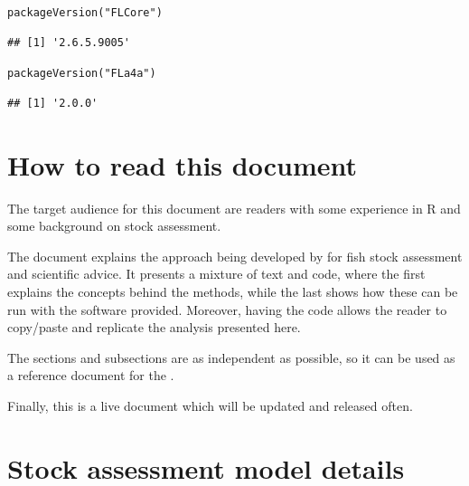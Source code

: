 \documentclass[a4paper,english,10pt]{article}\usepackage[]{graphicx}\usepackage[]{color}
\makeatletter
\newcommand{\hlstr}[1]{\textcolor[rgb]{0.063,0.58,0.627}{#1}}%
\newcommand{\hlstd}[1]{\textcolor[rgb]{0.196,0.196,0.196}{#1}}%
\newcommand{\hlkwd}[1]{\textcolor[rgb]{0.78,0.227,0.412}{#1}}%
\newenvironment{kframe}{%
 \def\at@end@of@kframe{}%
 \ifinner\ifhmode%
  \def\at@end@of@kframe{\end{minipage}}%
  \begin{minipage}{\columnwidth}%
 \fi\fi%
 \def\FrameCommand##1{\hskip\@totalleftmargin \hskip-\fboxsep
 \colorbox{shadecolor}{##1}\hskip-\fboxsep
     \hskip-\linewidth \hskip-\@totalleftmargin \hskip\columnwidth}%
 \MakeFramed {\advance\hsize-\width
   \@totalleftmargin\z@ \linewidth\hsize
   \@setminipage}}%
 {\par\unskip\endMakeFramed%
 \at@end@of@kframe}
\newenvironment{knitrout}{}{} %
\makeatother
\begin{document}
\begin{knitrout}
\color{fgcolor}\begin{kframe}
\begin{alltt}
\hlkwd{packageVersion}\hlstd{(}\hlstr{"FLCore"}\hlstd{)}
\end{alltt}
\begin{verbatim}
## [1] '2.6.5.9005'
\end{verbatim}
\begin{alltt}
\hlkwd{packageVersion}\hlstd{(}\hlstr{"FLa4a"}\hlstd{)}
\end{alltt}
\begin{verbatim}
## [1] '2.0.0'
\end{verbatim}
\end{kframe}
\end{knitrout}



\section{How to read this document}

The target audience for this document are readers with some experience in R and some background on stock assessment.

The document explains the approach being developed by \aFa for fish stock assessment and scientific advice. It presents a mixture of text and code, where the first explains the concepts behind the methods, while the last shows how these can be run with the software provided. Moreover, having the code allows the reader to copy/paste and replicate the analysis presented here.

The sections and subsections are as independent as possible, so it can be used as a reference document for the . 



Finally, this is a live document which will be updated and released often.



\section{Stock assessment model details}
\end{document}

